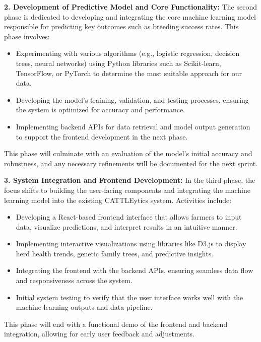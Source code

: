 \documentclass[12pt]{article}
\begin{document}
\textbf{2. Development of Predictive Model and Core Functionality:} The second
phase is dedicated to developing and integrating the core machine learning model
responsible for predicting key outcomes such as breeding success rates. This
phase involves:
\begin{itemize}
    \item Experimenting with various algorithms (e.g., logistic regression,
    decision trees, neural networks) using Python libraries such as
    Scikit-learn, TensorFlow, or PyTorch to determine the most suitable approach
    for our data.
    \item Developing the model's training, validation, and testing processes,
    ensuring the system is optimized for accuracy and performance.
    \item Implementing backend APIs for data retrieval and model output
    generation to support the frontend development in the next phase.
\end{itemize}
This phase will culminate with an evaluation of the model's initial accuracy and
robustness, and any necessary refinements will be documented for the next
sprint.

\textbf{3. System Integration and Frontend Development:} In the third phase, the
focus shifts to building the user-facing components and integrating the machine
learning model into the existing CATTLEytics system. Activities include:
\begin{itemize}
    \item Developing a React-based frontend interface that allows farmers to
    input data, visualize predictions, and interpret results in an intuitive
    manner.
    \item Implementing interactive visualizations using libraries like D3.js to
    display herd health trends, genetic family trees, and predictive insights.
    \item Integrating the frontend with the backend APIs, ensuring seamless data
    flow and responsiveness across the system.
    \item Initial system testing to verify that the user interface works well
    with the machine learning outputs and data pipeline.
\end{itemize}
This phase will end with a functional demo of the frontend and backend
integration, allowing for early user feedback and adjustments.
\end{document}
